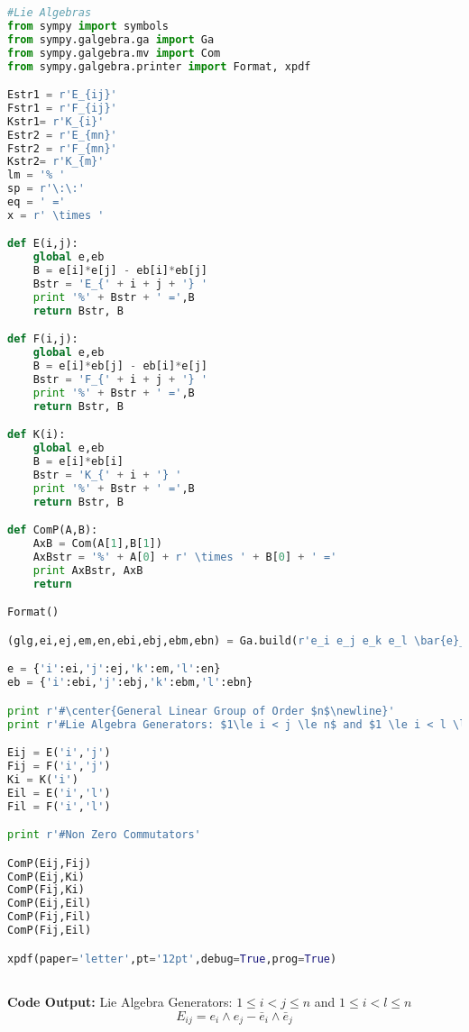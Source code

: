 \documentclass[12pt,fleqn]{report}
\begin{document}
\begin{lstlisting}[language=Python,showspaces=false,showstringspaces=false]
#Lie Algebras
from sympy import symbols
from sympy.galgebra.ga import Ga
from sympy.galgebra.mv import Com
from sympy.galgebra.printer import Format, xpdf

Estr1 = r'E_{ij}'
Fstr1 = r'F_{ij}'
Kstr1= r'K_{i}'
Estr2 = r'E_{mn}'
Fstr2 = r'F_{mn}'
Kstr2= r'K_{m}'
lm = '% '
sp = r'\:\:'
eq = ' ='
x = r' \times '

def E(i,j):
    global e,eb
    B = e[i]*e[j] - eb[i]*eb[j]
    Bstr = 'E_{' + i + j + '} '
    print '%' + Bstr + ' =',B
    return Bstr, B

def F(i,j):
    global e,eb
    B = e[i]*eb[j] - eb[i]*e[j]
    Bstr = 'F_{' + i + j + '} '
    print '%' + Bstr + ' =',B
    return Bstr, B

def K(i):
    global e,eb
    B = e[i]*eb[i]
    Bstr = 'K_{' + i + '} '
    print '%' + Bstr + ' =',B
    return Bstr, B

def ComP(A,B):
    AxB = Com(A[1],B[1])
    AxBstr = '%' + A[0] + r' \times ' + B[0] + ' ='
    print AxBstr, AxB
    return

Format()

(glg,ei,ej,em,en,ebi,ebj,ebm,ebn) = Ga.build(r'e_i e_j e_k e_l \bar{e}_i \bar{e}_j \bar{e}_k \bar{e}_l',g=[1,1,1,1,-1,-1,-1,-1])

e = {'i':ei,'j':ej,'k':em,'l':en}
eb = {'i':ebi,'j':ebj,'k':ebm,'l':ebn}

print r'#\center{General Linear Group of Order $n$\newline}'
print r'#Lie Algebra Generators: $1\le i < j \le n$ and $1 \le i < l \le n$'

Eij = E('i','j')
Fij = F('i','j')
Ki = K('i')
Eil = E('i','l')
Fil = F('i','l')

print r'#Non Zero Commutators'

ComP(Eij,Fij)
ComP(Eij,Ki)
ComP(Fij,Ki)
ComP(Eij,Eil)
ComP(Fij,Fil)
ComP(Fij,Eil)

xpdf(paper='letter',pt='12pt',debug=True,prog=True)



\end{lstlisting}
 {\Large \bf Code Output:} 
Lie Algebra Generators: $1\le i < j \le n$ and $1 \le i < l \le n$
\begin{equation*} E_{ij}  =  e_{i}\wedge e_{j} - \bar{e}_{i}\wedge \bar{e}_{j} \end{equation*}
\end{document}
